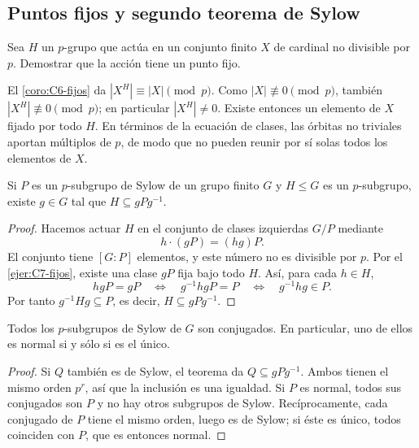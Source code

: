 \subsection{Puntos fijos y segundo teorema de Sylow}\label{tema:7-2-1}
\begin{ejer}\label{ejer:C7-fijos}
Sea $H$ un $p$-grupo que actúa en un conjunto finito $X$ de cardinal no divisible por $p$. Demostrar que la acción tiene un punto fijo.
\end{ejer}
\begin{sol}
El \cref{coro:C6-fijos} da $|X^H|\equiv|X|\pmod p$. Como $|X|\not\equiv0\pmod p$, también $|X^H|\not\equiv0\pmod p$; en particular $|X^H|\ne0$. Existe entonces un elemento de $X$ fijado por todo $H$. En términos de la ecuación de clases, las órbitas no triviales aportan múltiplos de $p$, de modo que no pueden reunir por sí solas todos los elementos de $X$.
\end{sol}

\begin{teo}\label{teo:C7-sylow-II}
Si $P$ es un $p$-subgrupo de Sylow de un grupo finito $G$ y $H\le G$ es un $p$-subgrupo, existe $g\in G$ tal que $H\subseteq gPg^{-1}$.
\end{teo}
\begin{proof}
Hacemos actuar $H$ en el conjunto de clases izquierdas $G/P$ mediante
\[
h\cdot(gP)=(hg)P.
\]
El conjunto tiene $[G:P]$ elementos, y este número no es divisible por $p$. Por el \cref{ejer:C7-fijos}, existe una clase $gP$ fija bajo todo $H$. Así, para cada $h\in H$,
\[
hgP=gP\quad\Longleftrightarrow\quad
g^{-1}hgP=P\quad\Longleftrightarrow\quad g^{-1}hg\in P.
\]
Por tanto $g^{-1}Hg\subseteq P$, es decir, $H\subseteq gPg^{-1}$.
\end{proof}

\begin{coro}\label{coro:C7-conjugados}
Todos los $p$-subgrupos de Sylow de $G$ son conjugados. En particular, uno de ellos es normal si y sólo si es el único.
\end{coro}
\begin{proof}
Si $Q$ también es de Sylow, el teorema da $Q\subseteq gPg^{-1}$. Ambos tienen el mismo orden $p^r$, así que la inclusión es una igualdad. Si $P$ es normal, todos sus conjugados son $P$ y no hay otros subgrupos de Sylow. Recíprocamente, cada conjugado de $P$ tiene el mismo orden, luego es de Sylow; si éste es único, todos coinciden con $P$, que es entonces normal.
\end{proof}

